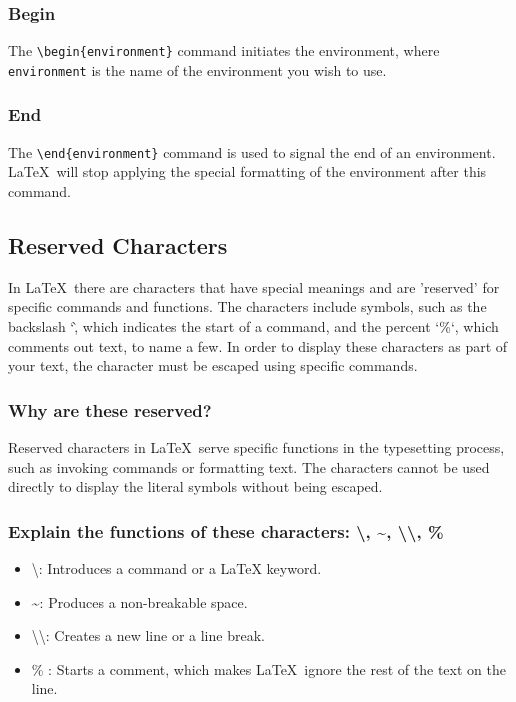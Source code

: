 \documentclass[12pt,journal,compsoc]{IEEEtran}
\begin{document}
\subsubsection{Begin}

The \texttt{\textbackslash begin\{environment\}} command initiates the environment, where \texttt{environment} is the name of the environment you wish to use.  

\subsubsection{End}

The \texttt{\textbackslash end\{environment\}} command is used to signal the end of an environment. \LaTeX\ will stop applying the special formatting of the environment after this command.  

\subsection{Reserved Characters}

In \LaTeX\, there are characters that have special meanings and are 'reserved' for specific commands and functions. The characters include symbols, such as the backslash `\`, which indicates the start of a command, and the percent `\%`, which comments out text, to name a few. In order to display these characters as part of your text, the character must be escaped using specific commands. 

\subsubsection{Why are these reserved?}

Reserved characters in \LaTeX\ serve specific functions in the typesetting process, such as invoking commands or formatting text. The characters cannot be used directly to display the literal symbols without being escaped.

\subsubsection{Explain the functions of these characters: \textbackslash , \textasciitilde , \textbackslash\textbackslash , \%}

\begin{itemize}
    \item \textbackslash : Introduces a command or a LaTeX keyword.
    \item \textasciitilde : Produces a non-breakable space.
    \item \textbackslash\textbackslash : Creates a new line or a line break.
    \item \% : Starts a comment, which makes \LaTeX\ ignore the rest of the text on the line.
\end{itemize}
\end{document}
